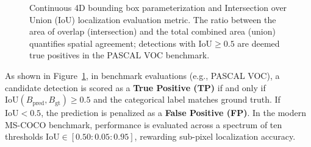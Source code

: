 \begin{figure}[H]
{%
}
\caption{Continuous 4D bounding box parameterization and Intersection over Union (IoU) localization evaluation metric. The ratio between the area of overlap (intersection) and the total combined area (union) quantifies spatial agreement; detections with $\text{IoU} \ge 0.5$ are deemed true positives in the PASCAL VOC benchmark.}
\label{fig:iou_bounding_box_schematic}
\end{figure}

As shown in Figure~\ref{fig:iou_bounding_box_schematic}, in benchmark evaluations (e.g., PASCAL VOC), a candidate detection is scored as a \textbf{True Positive (TP)} if and only if $\text{IoU}(B_{\text{pred}}, B_{\text{gt}}) \ge 0.5$ and the categorical label matches ground truth. If $\text{IoU} < 0.5$, the prediction is penalized as a \textbf{False Positive (FP)}. In the modern MS-COCO benchmark, performance is evaluated across a spectrum of ten thresholds $\text{IoU} \in [0.50 : 0.05 : 0.95]$, rewarding sub-pixel localization accuracy.

